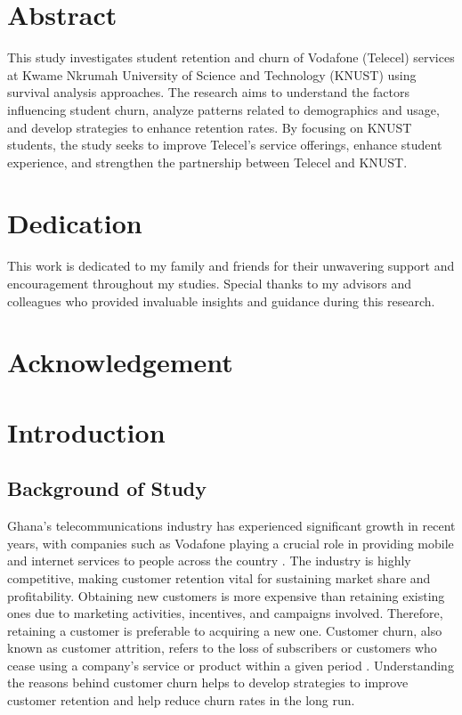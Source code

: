 \documentclass[12pt]{report}
\begin{document}
	
	
	
	\newpage
	\chapter*{Abstract}
	This study investigates student retention and churn of Vodafone (Telecel) services at Kwame Nkrumah University of Science and Technology (KNUST) using survival analysis approaches. The research aims to understand the factors influencing student churn, analyze patterns related to demographics and usage, and develop strategies to enhance retention rates. By focusing on KNUST students, the study seeks to improve Telecel's service offerings, enhance student experience, and strengthen the partnership between Telecel and KNUST.
	
	\newpage
	\chapter*{Dedication}
	This work is dedicated to my family and friends for their unwavering support and encouragement throughout my studies. Special thanks to my advisors and colleagues who provided invaluable insights and guidance during this research.
	
	\newpage
	\chapter*{Acknowledgement}
	
	\newpage
	\tableofcontents
	
	\newpage
	\listoffigures
	
	\newpage
	\listoftables
	
	
	
	
	
	\newpage
	\chapter{Introduction}
	
	
	\section{Background of Study}
	
	Ghana's telecommunications industry has experienced significant growth in recent years, with companies such as Vodafone playing a crucial role in providing mobile and internet services to people across the country \cite{bandim2022}. The industry is highly competitive, making customer retention vital for sustaining market share and profitability. Obtaining new customers is more expensive than retaining existing ones due to marketing activities, incentives, and campaigns involved. Therefore, retaining a customer is preferable to acquiring a new one. Customer churn, also known as customer attrition, refers to the loss of subscribers or customers who cease using a company’s service or product within a given period \cite{koranchirath2024}. Understanding the reasons behind customer churn helps to develop strategies to improve customer retention and help reduce churn rates in the long run.
	
\end{document}
